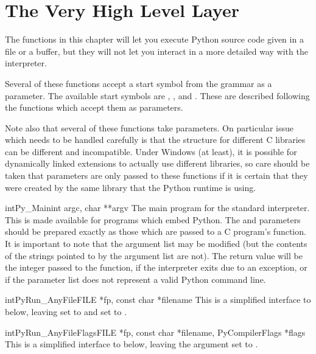 \chapter{The Very High Level Layer \label{veryhigh}}


The functions in this chapter will let you execute Python source code
given in a file or a buffer, but they will not let you interact in a
more detailed way with the interpreter.

Several of these functions accept a start symbol from the grammar as a 
parameter.  The available start symbols are ,
, and .  These are
described following the functions which accept them as parameters.

Note also that several of these functions take 
parameters.  On particular issue which needs to be handled carefully
is that the  structure for different C libraries can be
different and incompatible.  Under Windows (at least), it is possible
for dynamically linked extensions to actually use different libraries,
so care should be taken that  parameters are only passed
to these functions if it is certain that they were created by the same
library that the Python runtime is using.


\begin{cfuncdesc}{int}{Py_Main}{int argc, char **argv}
  The main program for the standard interpreter.  This is made
  available for programs which embed Python.  The  and
   parameters should be prepared exactly as those which are
  passed to a C program's  function.  It is
  important to note that the argument list may be modified (but the
  contents of the strings pointed to by the argument list are not).
  The return value will be the integer passed to the
   function,  if the interpreter exits
  due to an exception, or  if the parameter list does not
  represent a valid Python command line.
\end{cfuncdesc}

\begin{cfuncdesc}{int}{PyRun_AnyFile}{FILE *fp, const char *filename}
  This is a simplified interface to 
  below, leaving  set to  and  set to \NULL.
\end{cfuncdesc}

\begin{cfuncdesc}{int}{PyRun_AnyFileFlags}{FILE *fp, const char *filename,
                                           PyCompilerFlags *flags}
  This is a simplified interface to 
  below, leaving the  argument set to .
\end{cfuncdesc}

